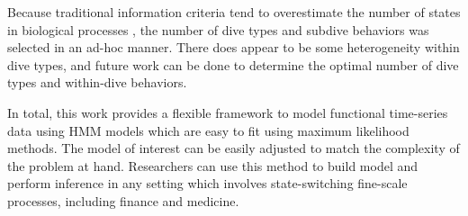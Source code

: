 Because traditional information criteria tend to overestimate the number of states in biological processes \citep{Pohle:2017}, the number of dive types and subdive behaviors was selected in an ad-hoc manner. There does appear to be some heterogeneity within dive types, and future work can be done to determine the optimal number of dive types and within-dive behaviors.

In total, this work provides a flexible framework to model functional time-series data using HMM models which are easy to fit using maximum likelihood methods. The model of interest can be easily adjusted to match the complexity of the problem at hand. Researchers can use this method to build model and perform inference in any setting which involves state-switching fine-scale processes, including finance and medicine. 